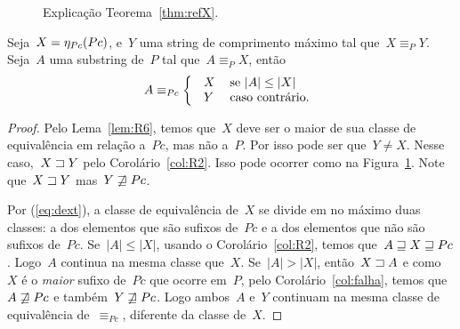 \begin{figure}
\centering

    \caption{Explicação Teorema~\ref{thm:refX}.}
    \label{fig:teo10}
\end{figure}

\begin{theorem}
\label{thm:refX}
Seja~$X = \eta_{Pc}(Pc)$, e~$Y$ uma string de comprimento máximo tal que~$X \equiv_P Y$. Seja~$A$ uma substring de~$P$ tal que~$A \equiv_P X$, então
\[
A \equiv_{Pc}
\left \{
  \begin{tabular}{ll}
 ~$X$ & se~$|A| \leq |X|$ \\
 ~$Y$ & caso contrário.
  \end{tabular}
\right .
\]
\end{theorem}

\begin{proof}
Pelo Lema~\ref{lem:R6}, temos que~$X$ deve ser o maior de sua classe de equivalência em relação a~$Pc$, mas não a~$P$. Por isso pode ser que~$Y \neq X$. Nesse caso,~$X \sqsupset Y$ pelo Corolário~\ref{col:R2}. Isso pode ocorrer como na Figura~\ref{fig:teo10}. Note que~$X \sqsupset Y$ mas~$Y \not\sqsupseteq Pc$.

Por (\ref{eq:dext}), a classe de equivalência de~$X$ se divide em no máximo duas classes: a dos elementos que são sufixos de~$Pc$ e a dos elementos que não são sufixos de~$Pc$. Se~$|A| \leq |X|$, usando o Corolário~\ref{col:R2}, temos que~$A \sqsupseteq X \sqsupseteq Pc$. Logo~$A$ continua na mesma classe que~$X$.
Se~$|A| > |X|$, então~$X \sqsupset A$ e como~$X$ é o \emph{maior} sufixo de~$Pc$ que ocorre em~$P$, pelo Corolário~\ref{col:falha}, temos que~$A \not\sqsupseteq Pc$ e também~$Y \not\sqsupseteq Pc$. Logo ambos~$A$ e~$Y$ continuam na mesma classe de equivalência de~$\equiv_{Pc}$, diferente da classe de~$X$.
\end{proof}

